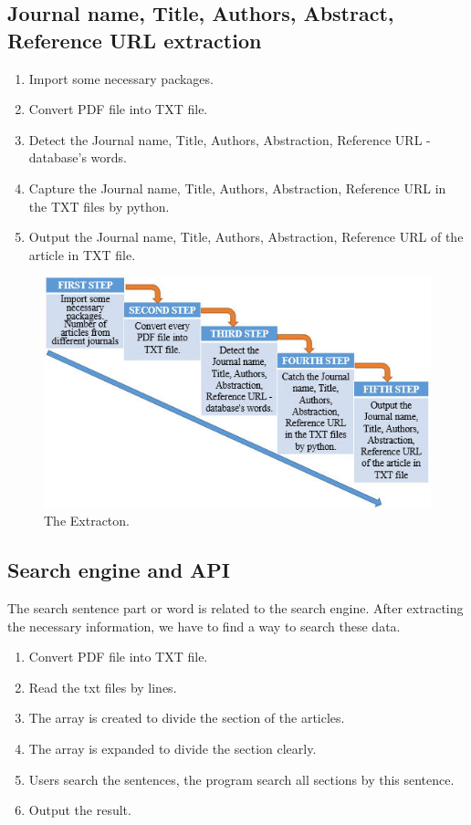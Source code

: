 	\subsection*{Journal name, Title, Authors, Abstract, Reference URL extraction}
		\begin{enumerate}
			\item Import some necessary packages.
			\item Convert PDF file into TXT file.
			\item Detect the Journal name, Title, Authors, Abstraction, Reference URL -database's words.
			\item Capture the Journal name, Title, Authors, Abstraction, Reference URL in the TXT files by python.
			\item Output the Journal name, Title, Authors, Abstraction, Reference URL of the article in TXT file.
		\end{enumerate}	

\begin{figure}[tbh]
	\begin{center}
		\includegraphics[width=\columnwidth]{Union_Method_Chart_Extraction}
	\end{center}
	\caption{The Extracton.}
\end{figure}

	\subsection*{Search engine and API}
	The search sentence part or word is related to the search engine. 
	After extracting the necessary information, we have to find a way to search these data.
		\begin{enumerate}
			\item Convert PDF file into TXT file.
			\item Read the txt files by lines.
			\item The array is created to divide the section of the articles.
			\item The array is expanded to divide the section clearly.
			\item Users search the sentences, the program search all sections by this sentence.
			\item Output the result.
		\end{enumerate}	

